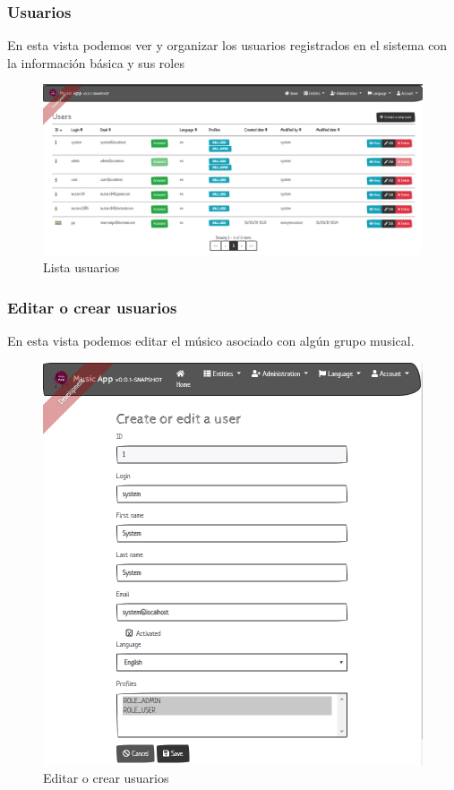 \subsubsection{Usuarios}
En esta vista podemos ver y organizar los usuarios registrados en el sistema con la información básica y sus roles
\begin{figure}[h!]
 \centering
\includegraphics[width=\linewidth]{Desarrollo/Interfaces/Interfaces/imgs/UserList.PNG}
\caption{Lista usuarios}
\end{figure}

\newpage

\subsubsection{Editar o crear usuarios}
En esta vista podemos editar el músico asociado con algún grupo musical.
\begin{figure}[h!]
 \centering
\includegraphics[width=0.8\linewidth]{Desarrollo/Interfaces/Interfaces/imgs/UserEdit.PNG}
\caption{Editar o crear usuarios}
\end{figure}

\newpage